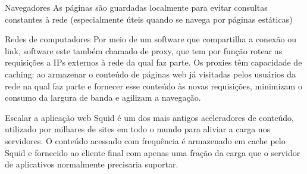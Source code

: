 \documentclass{if-beamer}
\begin{document}
		\begin{frame}
			\begin{block}{Navegadores}
				As páginas são guardadas localmente para evitar consultas constantes à rede (especialmente úteis quando se navega por páginas estáticas)
			\end{block}
			\begin{block}{Redes de computadores}
				Por meio de um software que compartilha a conexão ou link, software este também chamado de proxy, que tem por função rotear as requisições
				a IPs externos à rede da qual faz parte. Os proxies têm capacidade de caching: ao armazenar o conteúdo de páginas web já visitadas pelos 
				usuários da rede na qual faz parte e fornecer esse conteúdo às novas requisições, minimizam o consumo da largura de banda e agilizam a
				navegação.				
			\end{block}
		\end{frame}

%
%
			
		\begin{frame}{Escalar a aplicação web}
			Squid é um dos mais antigos aceleradores de conteúdo, utilizado por milhares de sites em todo o mundo
			para aliviar a carga nos servidores. O conteúdo acessado com frequência é armazenado em cache
			pelo Squid e fornecido ao cliente final com apenas uma fração da carga que o servidor de aplicativos 
			normalmente precisaria suportar. 
		\end{frame}
		
\end{document}
